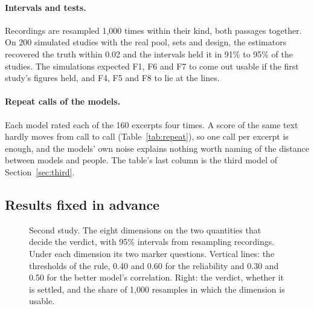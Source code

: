 \paragraph{Intervals and tests.} Recordings are resampled 1{,}000 times within their kind, both passages
together. On 200 simulated studies with the real pool, sets and design, the estimators recovered the truth
within 0.02 and the intervals held it in 91\% to 95\% of the studies. The simulations expected F1, F6 and F7 to
come out usable if the first study's figures held, and F4, F5 and F8 to lie at the lines.

\paragraph{Repeat calls of the models.} Each model rated each of the 160 excerpts four times. A score of the
same text hardly moves from call to call (Table~\ref{tab:repeat}), so one call per excerpt is enough, and the
models' own noise explains nothing worth naming of the distance between models and people. The table's last
column is the third model of Section~\ref{sec:third}.

\begin{table}[!htb]\centering
\caption{A model's score of the same text over four calls. Reliability of one call: the variance of the
excerpts' mean scores over that variance plus the variance between calls.}\label{tab:repeat}

\end{table}

\subsection{Results fixed in advance}\label{sec:secondresults}

\begin{figure}[!htb]\centering

\caption{Second study. The eight dimensions on the two quantities that decide the verdict, with 95\% intervals
from resampling recordings. Under each dimension its two marker questions. Vertical lines: the thresholds of the
rule, 0.40 and 0.60 for the reliability and 0.30 and 0.50 for the better model's correlation. Right: the
verdict, whether it is settled, and the share of 1{,}000 resamples in which the dimension is
usable.}\label{fig:s2verdicts}
\end{figure}

\begin{table}[!htb]\centering
\caption{Second study, plain figures per dimension: the reliability of the composite when each marker is rated
by five people, and each model's correlation of its dimension score with that composite, with 95\%
intervals.}\label{tab:s2primary}

\end{table}

